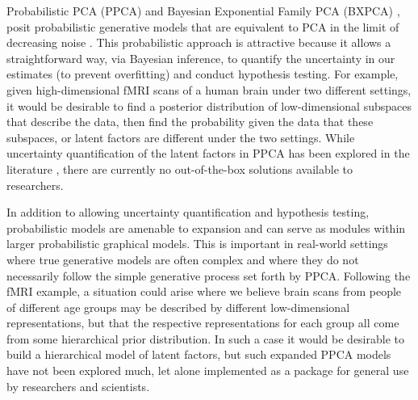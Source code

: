 \documentclass{article}
\begin{document}
Probabilistic PCA (PPCA) \citep{tipping1999probabilistic} and Bayesian Exponential Family PCA (BXPCA) \citep{mohamed2009bayesian}, posit probabilistic generative models that are equivalent to PCA in the limit of decreasing noise \citep[chapt.~12.2]{murphy2012machine}. This probabilistic approach is attractive because it allows a straightforward way, via Bayesian inference, to quantify the uncertainty in our estimates (to prevent overfitting) and conduct hypothesis testing. For example, given high-dimensional fMRI scans of a human brain under two different settings, it would be desirable to find a posterior distribution of low-dimensional subspaces that describe the data, then find the probability given the data that these subspaces, or latent factors are different under the two settings. While uncertainty quantification of the latent factors in PPCA has been explored in the literature \citep{hoff2009simulation,brubaker2012family, byrne2013geodesic}, there are currently no out-of-the-box solutions available to researchers. 

In addition to allowing uncertainty quantification and hypothesis testing, probabilistic models are amenable to expansion and can serve as modules within larger probabilistic graphical models. This is important in real-world settings where true generative models are often complex and where they do not necessarily follow the simple generative process set forth by PPCA. Following the fMRI example, a situation could arise where we believe brain scans from people of different age groups may be described by different low-dimensional representations, but that the respective representations for each group all come from some hierarchical prior distribution. In such a case it would be desirable to build a hierarchical model \cite[chapt.~5]{gelman2014bayesian} of latent factors, but such expanded PPCA models have not been explored much, let alone implemented as a package for general use by researchers and scientists.
\end{document}
